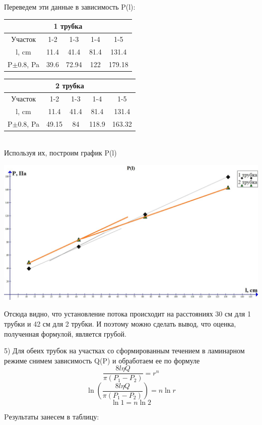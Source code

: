 \documentclass[a4paper,12pt]{article} %
\begin{document}
Переведем эти данные в зависимость P(l):  \\
\begin{tabular}{|c|c|c|c|c|}
\hline 
\multicolumn{5}{|c|}{1 трубка}\\ 
\hline 
\hline 
Участок & 1-2 & 1-3 & 1-4 & 1-5 \\ 
\hline 
l, cm & 11.4 & 41.4 & 81.4 & 131.4 \\ 
\hline 
P$\pm0.8$, Pa & 39.6 & 72.94 & 122 & 179.18 \\ 
\hline 
\end{tabular} 
\begin{tabular}{|c|c|c|c|c|}
\hline 
\multicolumn{5}{|c|}{2 трубка}\\ 
\hline 
\hline 
Участок & 1-2 & 1-3 & 1-4 & 1-5 \\ 
\hline 
l, cm & 11.4 & 41.4 & 81.4 & 131.4 \\ 
\hline 
P$\pm0.8$, Pa & 49.15 & 84 & 118.9 & 163.32 \\ 
\hline 
\end{tabular} \\ 

Используя их, построим график P(l)

\begin{center}
\includegraphics[scale=0.55]{1332}
\end{center}

Отсюда видно, что установление потока происходит на расстояниях 30 см для 1 трубки и 42 см для 2 трубки. И поэтому можно сделать вывод, что оценка, полученная формулой, является грубой.

5) Для обеих трубок на участках со сформированным течением в ламинарном режиме снимем зависимость Q(P) и обработаем ее по формуле 
$$\frac{8l\eta Q}{\pi(P_1-P_2)}=r^n$$
$$\ln(\frac{8l\eta Q}{\pi(P_1-P_2)})=n\ln r$$
$$\ln1=n\ln2$$

Pезультаты занесем в таблицу:
\end{document}
